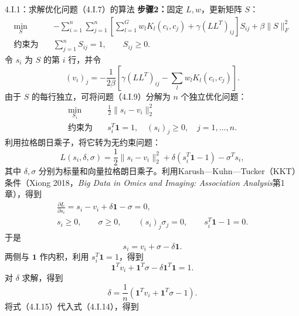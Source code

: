 \begin{bookalgorithm}{4.I.1：求解优化问题（4.I.7）的算法}
\textbf{步骤2：}固定 $L,w$，更新矩阵 $S$：
\begin{equation}
\begin{aligned}
\min_S\quad
 &-\sum_{i=1}^{n}\sum_{j=1}^{n}
 \left[\sum_{l=1}^{G}w_lK_l(c_i,c_j)+\gamma(LL^T)_{ij}\right]S_{ij}
 +\beta\|S\|_F^2\\
\text{约束为}\quad&\sum_{j=1}^{n}S_{ij}=1,\qquad S_{ij}\ge0.
\end{aligned}\tag{4.I.9}
\end{equation}
令 $s_i$ 为 $S$ 的第 $i$ 行，并令
\[
(v_i)_j=-\frac1{2\beta}
\left[\gamma(LL^T)_{ij}-\sum_lw_lK_l(c_i,c_j)\right].
\]
由于 $S$ 的每行独立，可将问题（4.I.9）分解为 $n$ 个独立优化问题：
\begin{equation}
\begin{aligned}
\min_{S_i}\quad&\frac12\|s_i-v_i\|_2^2\\
\text{约束为}\quad&s_i^T\mathbf1=1,\quad(s_i)_j\ge0,\quad j=1,\ldots,n.
\end{aligned}\tag{4.I.10}
\end{equation}
利用拉格朗日乘子，将它转为无约束问题：
\begin{equation}
L(s_i,\delta,\sigma)=\frac12\|s_i-v_i\|_2^2
+\delta(s_i^T\mathbf1-1)-\sigma^Ts_i,\tag{4.I.11}
\end{equation}
其中 $\delta,\sigma$ 分别为标量和向量拉格朗日乘子。利用Karush—Kuhn—Tucker（KKT）条件（Xiong 2018，\textit{Big Data in Omics and Imaging: Association Analysis}第1章），得到
\begin{equation}
\begin{gathered}
\frac{\partial L}{\partial s_i}=s_i-v_i+\delta\mathbf1-\sigma=0,\\
s_i\ge0,\qquad\sigma\ge0,\qquad(s_i)_j\sigma_j=0,\qquad
s_i^T\mathbf1-1=0.
\end{gathered}\tag{4.I.12}
\end{equation}
于是
\begin{equation}
s_i=v_i+\sigma-\delta\mathbf1.\tag{4.I.13}
\end{equation}
两侧与 $\mathbf1$ 作内积，利用 $s_i^T\mathbf1=1$，得到
\begin{equation}
\mathbf1^Tv_i+\mathbf1^T\sigma-\delta\mathbf1^T\mathbf1=1.\tag{4.I.14}
\end{equation}
对 $\delta$ 求解，得到
\begin{equation}
\delta=\frac1n(\mathbf1^Tv_i+\mathbf1^T\sigma-1).\tag{4.I.15}
\end{equation}
将式（4.I.15）代入式（4.I.14），得到
\begin{equation}

\end{equation}
\end{bookalgorithm}
